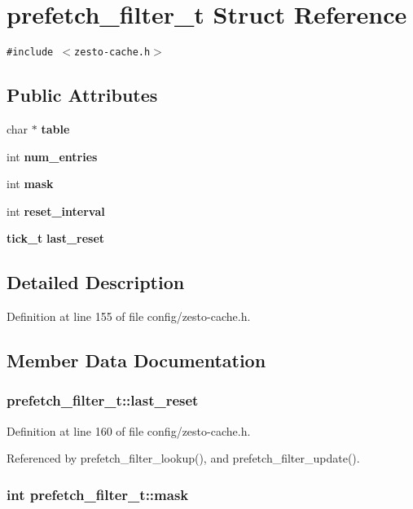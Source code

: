 \section{prefetch\_\-filter\_\-t Struct Reference}
\label{structprefetch__filter__t}
{\tt \#include $<$zesto-cache.h$>$}

\subsection*{Public Attributes}
\begin{CompactItemize}
\item 
char $\ast$ {\bf table}
\item 
int {\bf num\_\-entries}
\item 
int {\bf mask}
\item 
int {\bf reset\_\-interval}
\item 
{\bf tick\_\-t} {\bf last\_\-reset}
\end{CompactItemize}


\subsection{Detailed Description}


Definition at line 155 of file config/zesto-cache.h.

\subsection{Member Data Documentation}
\subsubsection[{last\_\-reset}]{ {\bf prefetch\_\-filter\_\-t::last\_\-reset}}\label{structprefetch__filter__t_b5d88bc1039b7090f8c9e86b2aaf5895}




Definition at line 160 of file config/zesto-cache.h.

Referenced by prefetch\_\-filter\_\-lookup(), and prefetch\_\-filter\_\-update().
\subsubsection[{mask}]{\setlength{\rightskip}{0pt plus 5cm}int {\bf prefetch\_\-filter\_\-t::mask}}\label{structprefetch__filter__t_85913932b8d7379a96254233822e146b}




